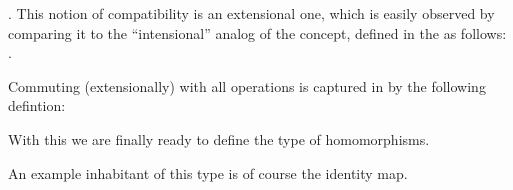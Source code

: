 \documentclass[a4paper,USenglish,cleveref,autoref,thm-restate]{lipics-v2019}
\begin{document}
\AgdaSpace{}%
\AgdaSymbol{((}\AgdaSpace{}%
\AgdaSpace{}%
\AgdaSymbol{)}\AgdaSpace{}%
\AgdaSymbol{)}\AgdaSpace{}%
\AgdaSpace{}%
\AgdaSymbol{(}\AgdaSpace{}%
\AgdaSpace{}%
\AgdaSymbol{)}\AgdaSpace{}%
\AgdaSymbol{(}\AgdaSpace{}%
\AgdaSpace{}%
\AgdaSymbol{)}. This notion of compatibility is an extensional one, which is easily observed by comparing it to the ``intensional'' analog of the concept, defined in the \agdaualib as follows:
\AgdaSpace{}%
\AgdaSpace{}%
\AgdaSpace{}%
\AgdaSpace{}%
\AgdaSymbol{((}\AgdaSpace{}%
\AgdaSpace{}%
\AgdaSymbol{)}\AgdaSpace{}%
\AgdaSymbol{))}\AgdaSpace{}%
\AgdaSpace{}%
\AgdaSpace{}%
\AgdaSpace{}%
\AgdaSpace{}%
\AgdaSymbol{(}\AgdaSpace{}%
\AgdaSpace{}%
\AgdaSymbol{)(}\AgdaSpace{}%
\AgdaSpace{}%
\AgdaSymbol{))}.

Commuting (extensionally) with all operations is captured in \agda by the following defintion:
\begin{code}\end{code}
With this we are finally ready to define the type of homomorphisms.
\begin{code}\end{code}
An example inhabitant of this type is of course the identity map.
\begin{code}
\>[0]\AgdaSpace{}%
\AgdaSymbol{:}%
\>[6]\AgdaSymbol{(}\AgdaSpace{}%
\AgdaSymbol{:}\AgdaSpace{}%
\AgdaSpace{}%
\AgdaSpace{}%
\AgdaSymbol{)}\AgdaSpace{}%
\AgdaSpace{}%
\AgdaSpace{}%
\AgdaSpace{}%
\<%
\\
\>[0]\AgdaSpace{}%
\AgdaSymbol{\AgdaUnderscore{}}\AgdaSpace{}%
\AgdaSymbol{=}\AgdaSpace{}%
\AgdaSpace{}%
\AgdaSpace{}%
\AgdaSpace{}%
\AgdaSymbol{)}\AgdaSpace{}%
\AgdaOperator{\AgdaInductiveConstructor{,}}\AgdaSpace{}%
\AgdaSpace{}%
\AgdaBound{\AgdaUnderscore{}}\AgdaSpace{}%
\AgdaBound{\AgdaUnderscore{}}\AgdaSpace{}%
\AgdaSpace{}%
\<%
\end{code}
\end{document}
